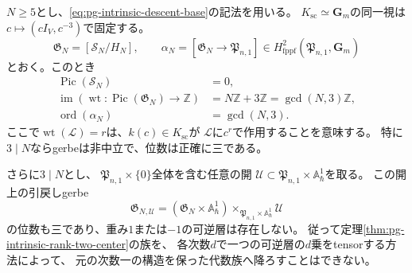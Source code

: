 \begin{proposition}[全階数二層のgerbeの位数]
\label{prop:pg-intrinsic-gerbe-period}
$N\ge5$とし、\eqref{eq:pg-intrinsic-descent-base}の記法を用いる。
$K_{\mathrm{sc}}\simeq\mathbf G_m$の同一視は
$c\mapsto(cI_V,c^{-3})$で固定する。
\begin{equation}
 \mathfrak G_N=[\mathcal S_N/H_N],\qquad
 \alpha_N=[\mathfrak G_N\to\mathfrak P_{n,1}]
 \in H^2_{\mathrm{fppf}}(\mathfrak P_{n,1},\mathbf G_m)
 \label{eq:pg-intrinsic-gerbe-class}
\end{equation}
とおく。このとき
\begin{equation}
 \begin{aligned}
 \operatorname{Pic}(\mathcal S_N)&=0,\\
 \operatorname{im}\left(
 \operatorname{wt}:\operatorname{Pic}(\mathfrak G_N)\to\mathbb Z
 \right)&=N\mathbb Z+3\mathbb Z=\gcd(N,3)\mathbb Z,\\
 \operatorname{ord}(\alpha_N)&=\gcd(N,3).
 \end{aligned}
 \label{eq:pg-intrinsic-gerbe-period}
\end{equation}
ここで$\operatorname{wt}(\mathcal L)=r$は、$k(c)\in K_{\mathrm{sc}}$が
$\mathcal L$に$c^r$で作用することを意味する。
特に$3\mid N$ならgerbeは非中立で、位数は正確に三である。

さらに$3\mid N$とし、
$\mathfrak P_{n,1}\times\{0\}$全体を含む任意の開
$\mathcal U\subset\mathfrak P_{n,1}\times\mathbb A^1_\hbar$を取る。
この開上の引戻しgerbe
\begin{equation}
 \mathfrak G_{N,\mathcal U}
 = (\mathfrak G_N\times\mathbb A^1_\hbar)
     \times_{\mathfrak P_{n,1}\times\mathbb A^1_\hbar}\mathcal U
 \label{eq:pg-intrinsic-gerbe-neighborhood}
\end{equation}
の位数も三であり、重み$1$または$-1$の可逆層は存在しない。
従って定理\ref{thm:pg-intrinsic-rank-two-center}の族を、
各次数$d$で一つの可逆層の$d$乗をtensorする方法によって、
元の次数一の構造を保った代数族へ降ろすことはできない。
\end{proposition}

